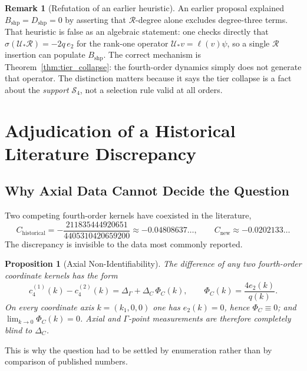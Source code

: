 \documentclass[11pt,a4paper]{article}
\newtheorem{proposition}[theorem]{Proposition}
\theoremstyle{definition}
\newtheorem{remark}[theorem]{Remark}
\newcommand{\Rc}{\mathcal{R}}          %
\newcommand{\Bshp}{B_{\mathrm{shp}}}
\newcommand{\Dshp}{D_{\mathrm{shp}}}
\begin{document}
\begin{remark}[Refutation of an earlier heuristic]\label{rem:UR_heuristic}
An earlier proposal explained $\Bshp = \Dshp = 0$ by asserting that $\Rc$-degree alone excludes degree-three terms. That heuristic is false as an algebraic statement: one checks directly that $\sigma(\mathcal{U}_{\!*}\Rc) = -2q\,e_2$ for the rank-one operator $\mathcal{U}_{\!*}v = \ell(v)\psi$, so a single $\Rc$ insertion can populate $\Bshp$. The correct mechanism is Theorem~\ref{thm:tier_collapse}: the fourth-order dynamics simply does not generate that operator. The distinction matters because it says the tier collapse is a fact about the \emph{support} $\mathcal{S}_4$, not a selection rule valid at all orders.
\end{remark}

\section{Adjudication of a Historical Literature Discrepancy}\label{sec:adjudication}

\subsection{Why Axial Data Cannot Decide the Question}

Two competing fourth-order kernels have coexisted in the literature,
\begin{equation}
  C_{\mathrm{historical}} = -\frac{211835444920651}{4405310420659200} \approx -0.04808637\ldots,
  \qquad C_{\mathrm{new}} \approx -0.0202133\ldots
\end{equation}
The discrepancy is invisible to the data most commonly reported.

\begin{proposition}[Axial Non-Identifiability]\label{prop:axial_blindness}
The difference of any two fourth-order coordinate kernels has the form
\begin{equation}\label{eq:crosswalk}
  c_4^{(1)}(k) - c_4^{(2)}(k) = \Delta_\Gamma + \Delta_C\,\Phi_C(k), \qquad \Phi_C(k) = \frac{4e_2(k)}{q(k)} .
\end{equation}
On every coordinate axis $k = (k_1,0,0)$ one has $e_2(k) = 0$, hence $\Phi_C\equiv0$; and $\lim_{k\to0}\Phi_C(k) = 0$. Axial and $\Gamma$-point measurements are therefore completely blind to $\Delta_C$.
\end{proposition}

This is why the question had to be settled by enumeration rather than by comparison of published numbers.
\end{document}
